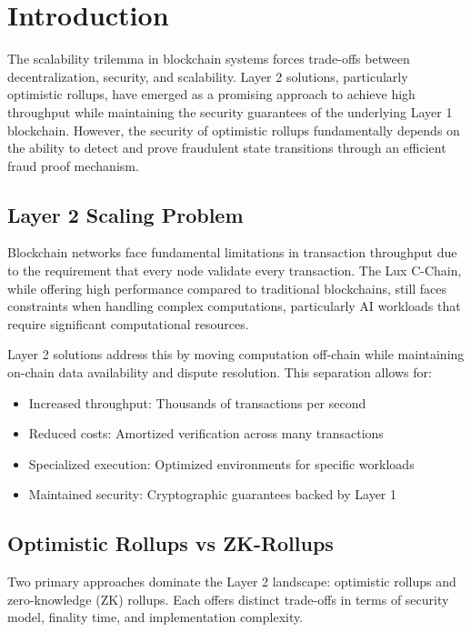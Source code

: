 \section{Introduction}


The scalability trilemma in blockchain systems forces trade-offs between decentralization, security, and scalability. Layer 2 solutions, particularly optimistic rollups, have emerged as a promising approach to achieve high throughput while maintaining the security guarantees of the underlying Layer 1 blockchain. However, the security of optimistic rollups fundamentally depends on the ability to detect and prove fraudulent state transitions through an efficient fraud proof mechanism.

\subsection{Layer 2 Scaling Problem}

Blockchain networks face fundamental limitations in transaction throughput due to the requirement that every node validate every transaction. The Lux C-Chain, while offering high performance compared to traditional blockchains, still faces constraints when handling complex computations, particularly AI workloads that require significant computational resources.

Layer 2 solutions address this by moving computation off-chain while maintaining on-chain data availability and dispute resolution. This separation allows for:
\begin{itemize}
    \item Increased throughput: Thousands of transactions per second
    \item Reduced costs: Amortized verification across many transactions
    \item Specialized execution: Optimized environments for specific workloads
    \item Maintained security: Cryptographic guarantees backed by Layer 1
\end{itemize}

\subsection{Optimistic Rollups vs ZK-Rollups}

Two primary approaches dominate the Layer 2 landscape: optimistic rollups and zero-knowledge (ZK) rollups. Each offers distinct trade-offs in terms of security model, finality time, and implementation complexity.

